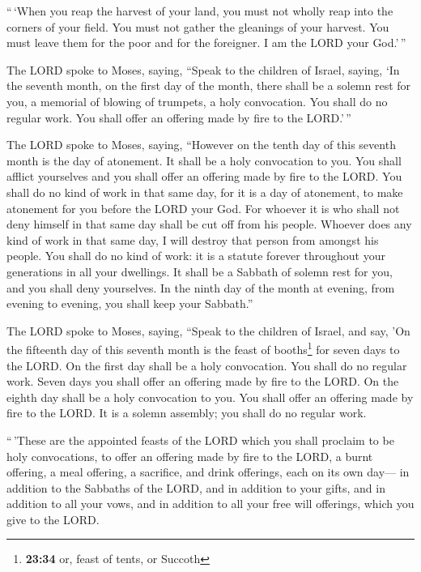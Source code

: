  ``\,`When you reap the harvest of your land, you must
not wholly reap into the corners of your field. You must not gather the
gleanings of your harvest. You must leave them for the poor and for the
foreigner. I am the LORD your God.'\,''

 The LORD spoke to Moses, saying,  ``Speak
to the children of Israel, saying, `In the seventh month, on the first
day of the month, there shall be a solemn rest for you, a memorial of
blowing of trumpets, a holy convocation.  You shall do no
regular work. You shall offer an offering made by fire to the LORD.'\,''

 The LORD spoke to Moses, saying, 
``However on the tenth day of this seventh month is the day of
atonement. It shall be a holy convocation to you. You shall afflict
yourselves and you shall offer an offering made by fire to the LORD.
 You shall do no kind of work in that same day, for it is
a day of atonement, to make atonement for you before the LORD your God.
 For whoever it is who shall not deny himself in that
same day shall be cut off from his people.  Whoever does
any kind of work in that same day, I will destroy that person from
amongst his people.  You shall do no kind of work: it is
a statute forever throughout your generations in all your dwellings.
 It shall be a Sabbath of solemn rest for you, and you
shall deny yourselves. In the ninth day of the month at evening, from
evening to evening, you shall keep your Sabbath.''

 The LORD spoke to Moses, saying,  ``Speak
to the children of Israel, and say, 'On the fifteenth day of this
seventh month is the feast of booths\footnote{\textbf{23:34} or, feast
  of tents, or Succoth} for seven days to the LORD.  On
the first day shall be a holy convocation. You shall do no regular work.
 Seven days you shall offer an offering made by fire to
the LORD. On the eighth day shall be a holy convocation to you. You
shall offer an offering made by fire to the LORD. It is a solemn
assembly; you shall do no regular work.

 ``\,'These are the appointed feasts of the LORD which
you shall proclaim to be holy convocations, to offer an offering made by
fire to the LORD, a burnt offering, a meal offering, a sacrifice, and
drink offerings, each on its own day---  in addition to
the Sabbaths of the LORD, and in addition to your gifts, and in addition
to all your vows, and in addition to all your free will offerings, which
you give to the LORD.


